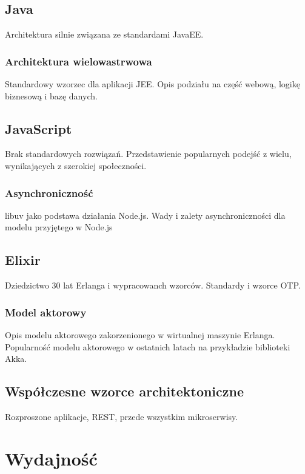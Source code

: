 \subsection{Java}

Architektura silnie związana ze standardami JavaEE.

\subsubsection{Architektura
wielowastrwowa}

Standardowy wzorzec dla aplikacji JEE. Opis podziału na część webową,
logikę biznesową i bazę danych.

\subsection{JavaScript}

Brak standardowych rozwiązań. Przedstawienie popularnych podejść z
wielu, wynikających z szerokiej społeczności.

\subsubsection{Asynchroniczność}

libuv jako podstawa działania Node.js. Wady i zalety asynchroniczności
dla modelu przyjętego w Node.js

\subsection{Elixir}

Dziedzictwo 30 lat Erlanga i wypracowanch wzorców. Standardy i wzorce
OTP.

\subsubsection{Model aktorowy}

Opis modelu aktorowego zakorzenionego w wirtualnej maszynie Erlanga.
Popularność modelu aktorowego w ostatnich latach na przykładzie
biblioteki Akka.

\subsection{Współczesne wzorce
architektoniczne}

Rozproszone aplikacje, REST, przede wszystkim mikroserwisy.

\section{Wydajność}

